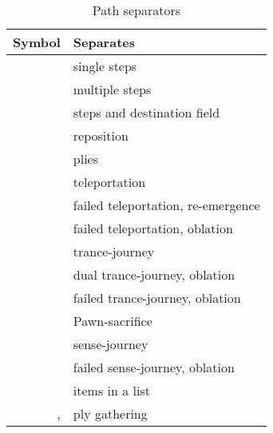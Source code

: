 \begin{table}[!h]
\centering
\begin{tabular}{ rl }
\toprule %
\textbf{Symbol}      & \textbf{Separates}                         \\
\midrule %
\alg{.}              & single steps                               \\
\alg{..}             & multiple steps                             \\
\alg{-}              & steps and destination field                \\
\alg{\textbackslash} & reposition                                 \\
\cmidrule{1-2} %
\alg{\~{}}           & plies                                      \\
\alg{|}              & teleportation                              \\
\alg{||}             & failed teleportation, re-emergence         \\
\alg{|||}            & failed teleportation, oblation             \\
\alg{@}              & trance-journey                             \\
\alg{@@}             & dual trance-journey, oblation              \\
\alg{@@@}            & failed trance-journey, oblation            \\
\alg{;;}             & Pawn-sacrifice                             \\
\alg{"}              & sense-journey                              \\
\alg{'}              & failed sense-journey, oblation             \\
\cmidrule{1-2} %
\alg{,}              & items in a list                            \\
\alg{[}, \alg{]}     & ply gathering                              \\
\bottomrule %
\end{tabular}
\caption{Path separators}
\label{tbl:Appendix/Summary/Path separators}
\end{table}

